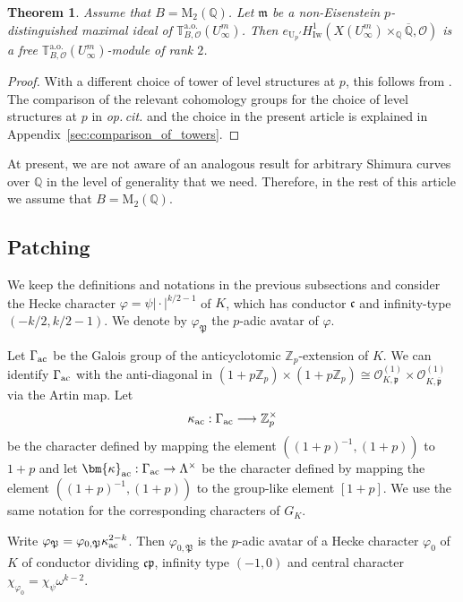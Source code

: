 \documentclass{amsart}
\numberwithin{equation}{section}
\newtheorem{theorem}{Theorem}[section]
\newcommand{\bb}{\mathbb}
\newcommand{\frk}{\mathfrak}
\newcommand{\Iw}{\mathrm{Iw}}
\newcommand{\ac}{\textup{ac}}
\begin{document}
\begin{theorem}
    Assume that $B=\mathrm{M}_2(\bb{Q})$. Let $\frk{m}$ be a non-Eisenstein $p$-distinguished maximal ideal of $\mathbb{T}^{\mathrm{a.o.}}_{B,\mathcal{O}}(U_{\infty}^m)$. Then $e_{\mathrm{U}_p'}H^1_{\Iw}(X(U_\infty^m)\times_{\bb{Q}}\overline{\bb{Q}},\mathcal{O})$ is a free $\mathbb{T}^{\mathrm{a.o.}}_{B,\mathcal{O}}(U_{\infty}^m)$-module of rank $2$.
\end{theorem}
\begin{proof}
    With a different choice of tower of level structures at $p$, this follows from \cite[Prop.~3.3.1]{EPW}. The comparison of the relevant cohomology groups for the choice of level structures at $p$ in \emph{op.\,cit.} and the choice in the present article is explained in Appendix~\ref{sec:comparison_of_towers}.
\end{proof}

At present, we are not aware of an analogous result for arbitrary Shimura curves over $\bb{Q}$ in the level of generality that we need. Therefore, in the rest of this article we assume that $B=\mathrm{M}_2(\bb{Q})$.



\subsection{Patching}

We keep the definitions and notations in the previous subsections and consider the Hecke character $\varphi=\psi\vert\cdot\vert^{k/2-1}$ of $K$, which has conductor $\frk{c}$ and infinity-type $(-k/2,k/2-1)$. We denote by $\varphi_{\frk{P}}$ the $p$-adic avatar of $\varphi$.



Let $\Gamma_{\ac}$ be the Galois group of the anticyclotomic $\bb{Z}_p$-extension of $K$. We can identify $\Gamma_{\ac}$  with the anti-diagonal in $(1+p\bb{Z}_p)\times (1+p\bb{Z}_p)\cong \mathcal{O}_{K,\frk{p}}^{(1)}\times \mathcal{O}_{K,\overline{\frk{p}}}^{(1)}$ via the Artin map. Let 
\[
\kappa_{\ac}:\Gamma_{\ac}\longrightarrow \bb{Z}_p^\times
\]
be the character defined by mapping the element $((1+p)^{-1},(1+p))$ to $1+p$ and let $\bm{\kappa}_{\ac}:\Gamma_{\ac}\rightarrow \Lambda^\times$ be the character defined by mapping the element $((1+p)^{-1}, (1+p))$ to the group-like element $[1+p]$. We use the same notation for the corresponding characters of $G_K$.

Write $\varphi_{\frk{P}}=\varphi_{0,\frk{P}}\kappa_{\ac}^{2-k}$. Then $\varphi_{0,\frk{P}}$ is the $p$-adic avatar of a Hecke character $\varphi_0$ of $K$ of conductor dividing $\frk{cp}$, infinity type $(-1,0)$ and central character $\chi_{\varphi_0}=\chi_\psi\omega^{k-2}$.
\end{document}
